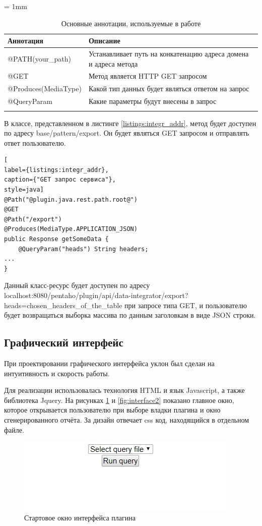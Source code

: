 \tabulinesep = 1mm
\begin{longtabu} to \textwidth {| X[c,m] | X[c,m] |}
	 \firsthline\hline
	Аннотация & Описание\\ \hline
	\endfirsthead
	@PATH(your\_path) & Устанавливает путь на конкатенацию адреса домена и адреса метода\\ \hline
	@GET& Метод является HTTP GET запросом\\ \hline
	@Produces(MediaType)& Какой тип данных будет являться ответом на запрос\\ \hline
	@QueryParam& Какие параметры будут внесены в запрос\\ \hline
	\caption{Основные аннотации, используемые в работе}
	\label{tab:annotations}
\end{longtabu}

В классе, представленном в листинге \ref{listings:integr_addr}, метод будет доступен по адресу base/pattern/export. Он будет являться GET запросом и отправлять ответ пользователю.

\begin{lstlisting}[
label={listings:integr_addr},
caption={"GET запрос сервиса"},
style=java]
@Path("@plugin.java.rest.path.root@")
@GET
@Path("/export")
@Produces(MediaType.APPLICATION_JSON)
public Response getSomeData {
	@QueryParam("heads") String headers;
...
}
\end{lstlisting}

Данный класс-ресурс будет доступен по адресу localhost:8080/pentaho/plugin/api/data-integrator/export?heads=chosen\_headers\_of\_the\_table при запросе типа GET, и пользователю будет возвращаться выборка массива по данным заголовкам в виде JSON строки.

\subsection{Графический интерфейс}

При проектировании графического интерфейса уклон был сделан на интуитивность и скорость работы. 

Для реализации использовалась технология HTML и язык Javascript, а также библиотека Jquery. На рисунках \ref{fig:interface1} и \ref{fig:interface2} показано главное окно, которое открывается пользователю при выборе владки плагина и окно сгенерированного отчёта. За дизайн отвечает css код, находящийся в отдельном файле.

\begin{figure}[htbp]
	\centering
	\includegraphics[width=.82\textwidth]{fig/chapter_4/interface1}
	\caption{Стартовое окно интерфейса плагина}
	\label{fig:interface1}
\end{figure}

